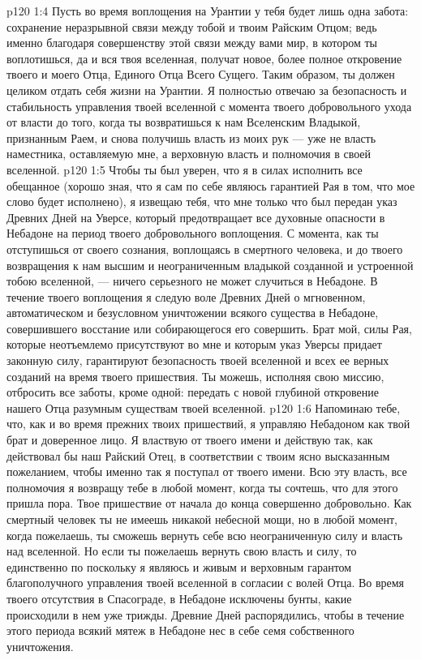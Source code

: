 \vs p120 1:4 Пусть во время воплощения на Урантии у тебя будет лишь одна забота: сохранение неразрывной связи между тобой и твоим Райским Отцом; ведь именно благодаря совершенству этой связи между вами мир, в котором ты воплотишься, да и вся твоя вселенная, получат новое, более полное откровение твоего и моего Отца, Единого Отца Всего Сущего. Таким образом, ты должен целиком отдать себя жизни на Урантии. Я полностью отвечаю за безопасность и стабильность управления твоей вселенной с момента твоего добровольного ухода от власти до того, когда ты возвратишься к нам Вселенским Владыкой, признанным Раем, и снова получишь власть из моих рук --- уже не власть наместника, оставляемую мне, а верховную власть и полномочия в своей вселенной.
\vs p120 1:5 Чтобы ты был уверен, что я в силах исполнить все обещанное (хорошо зная, что я сам по себе являюсь гарантией Рая в том, что мое слово будет исполнено), я извещаю тебя, что мне только что был передан указ Древних Дней на Уверсе, который предотвращает все духовные опасности в Небадоне на период твоего добровольного воплощения. С момента, как ты отступишься от своего сознания, воплощаясь в смертного человека, и до твоего возвращения к нам высшим и неограниченным владыкой созданной и устроенной тобою вселенной, --- ничего серьезного не может случиться в Небадоне. В течение твоего воплощения я следую воле Древних Дней о мгновенном, автоматическом и безусловном уничтожении всякого существа в Небадоне, совершившего восстание или собирающегося его совершить. Брат мой, силы Рая, которые неотъемлемо присутствуют во мне и которым указ Уверсы придает законную силу, гарантируют безопасность твоей вселенной и всех ее верных созданий на время твоего пришествия. Ты можешь, исполняя свою миссию, отбросить все заботы, кроме одной: передать с новой глубиной откровение нашего Отца разумным существам твоей вселенной.
\vs p120 1:6 Напоминаю тебе, что, как и во время прежних твоих пришествий, я управляю Небадоном как твой брат и доверенное лицо. Я властвую от твоего имени и действую так, как действовал бы наш Райский Отец, в соответствии с твоим ясно высказанным пожеланием, чтобы именно так я поступал от твоего имени. Всю эту власть, все полномочия я возвращу тебе в любой момент, когда ты сочтешь, что для этого пришла пора. Твое пришествие от начала до конца совершенно добровольно. Как смертный человек ты не имеешь никакой небесной мощи, но в любой момент, когда пожелаешь, ты сможешь вернуть себе всю неограниченную силу и власть над вселенной. Но если ты пожелаешь вернуть свою власть и силу, то единственно по  поскольку я являюсь и живым и верховным гарантом благополучного управления твоей вселенной в согласии с волей Отца. Во время твоего отсутствия в Спасограде, в Небадоне исключены бунты, какие происходили в нем уже трижды. Древние Дней распорядились, чтобы в течение этого периода всякий мятеж в Небадоне нес в себе семя собственного уничтожения.
